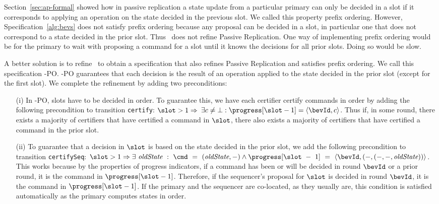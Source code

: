 \label{sec:bev-prefix}

Section~\ref{sec:ap-formal} showed how in passive replication a state
update from a particular primary can only be decided in a slot if it corresponds to applying an operation
on the state decided in the previous slot.
We called this property prefix ordering.
However, Specification~\ref{alg:bevs} does not satisfy prefix ordering
because any proposal can be decided in a slot, in particular one that
does not correspond to a state decided in the prior slot.
Thus \multiconsensus\ does not refine Passive Replication.
One way of implementing prefix ordering would be for the primary to
wait with proposing a command for a slot until it knows the decisions
for all prior slots.
Doing so would be slow.

A better solution is to refine \multiconsensus\ to obtain a
specification that also refines Passive Replication and satisfies
prefix ordering.  We call this specification \multiconsensus-PO.
\multiconsensus-PO guarantees that each decision is the result
of an operation applied to the state decided in the prior slot
(except for the first slot).
We complete the refinement by adding two preconditions:
\begin{enumerate}
\item[(i)]
In \multiconsensus-PO, slots have to be decided in order.
To guarantee this, we have each certifier certify commands
in order by adding the following
precondition to transition \texttt{certify}:
$\slot > 1 \Rightarrow$ $\exists c \ne \bot: \progress[\slot - 1] = \langle \bevId, c \rangle$.
Thus if, in some round, there exists a majority of certifiers that have
certified a command in $\slot$, there also exists a majority of certifiers
that have certified a command in the prior slot.

\item[(ii)]
To guarantee that a decision in $\slot$ is based on the state
decided in the prior slot, we add the following precondition to transition \texttt{certifySeq}:
$\slot > 1 \Rightarrow \exists~\textit{oldState}~:~\cmd~=~(\textit{oldState}, -) \land \progress[\slot~-~1]~=~\langle \bevId, (-, (-,-,\textit{oldState})) \rangle$.
This works because by the properties of progress indicators, if a
command has been or will be decided in round $\bevId$ or a prior round,
it is the command in $\progress[\slot-1]$.
Therefore, if the sequencer's proposal for $\slot$ is decided in round $\bevId$, it is the command in $\progress[\slot-1]$.
If the primary and the sequencer are co-located, as they usually are,
this condition is satisfied automatically as the primary computes
states in order.
\end{enumerate}

